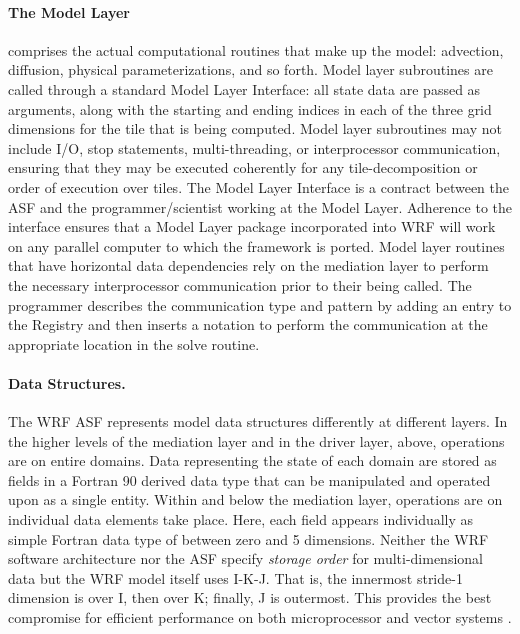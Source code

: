 \paragraph{The Model Layer} 
comprises the actual computational routines that make
up the model:  advection, diffusion, physical parameterizations, and so
forth. Model layer subroutines are called through a standard Model
Layer Interface: all state data are passed as arguments, along with the
starting and ending indices in each of the three grid dimensions for
the tile that is being computed. Model layer subroutines may not
include I/O, stop statements, multi-threading, or interprocessor
communication, ensuring that they may be executed coherently for any
tile-decomposition or order of execution over tiles. The Model Layer
Interface is a contract between the ASF and the programmer/scientist
working at the Model Layer. Adherence to the interface ensures that a
Model Layer package incorporated into WRF will work on any parallel
computer to which the framework is ported. Model layer routines that
have horizontal data dependencies rely on the mediation layer to perform the
necessary interprocessor communication prior to their being called. The
programmer describes the communication type and pattern by adding an
entry to the Registry and then inserts a notation to perform the
communication at the appropriate location in the solve routine.

\paragraph{Data Structures.} \label{ds} The WRF ASF represents model
data structures differently at different layers.  In the higher levels
of the mediation layer and in the driver layer, above, operations are
on entire domains. Data representing the state of each domain are stored
as fields in a Fortran 90 derived data type that can be manipulated and
operated upon as a single entity.  Within and below the mediation
layer, operations are on individual data elements take place. Here,
each field appears individually as simple Fortran data type of between
zero and 5 dimensions.  Neither the WRF software architecture nor the
ASF specify {\em storage order} for multi-dimensional data but the WRF model itself
uses I-K-J. That is, the innermost stride-1 dimension is over I, then over
K; finally, J is outermost. This provides
the best compromise for efficient performance on both microprocessor and
vector systems \citep{michalak01}.

